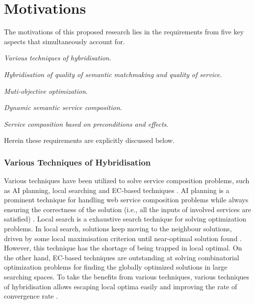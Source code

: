 \section{Motivations}\label{C:motivation}
The motivations of this proposed research lies in the requirements from five key aspects that simultaneously account for. 
\begin{enumerate*}
 \item \emph{Various techniques of hybridisation}.
 \item \emph{Hybridisation of quality of semantic matchmaking and quality of service}.
 \item \emph{Muti-objective optimization}.
 \item \emph{Dynamic semantic service composition}.
 \item \emph{Service composition based on preconditions and effects}.
\end{enumerate*}
Herein these requirements are explicitly discussed below. 
\subsubsection{Various Techniques of Hybridisation}

Various techniques have been utilized to solve service composition problems, such as AI planning, local searching and EC-based techniques \cite{feng2013dynamic,parejo2008qos,qi2010combining,wang2014automated}. AI planning is a prominent technique for handling web service composition problems while always ensuring the correctness of the solution (i.e., all the inputs of involved services are satisfied) \cite{wang2014automated}.  Local search is a exhaustive search technique for solving optimization problems. In local search, solutions keep moving to the neighbour solutions, driven by some local maximisation criterion until near-optimal solution found \cite{parejo2008qos}. However, this technique has the shortage of being trapped in local optimal. On the other hand, EC-based techniques are outstanding at solving combinatorial optimization problems for finding the globally optimized solutions in large searching spaces. To take the benefits from various techniques,  various techniques of hybridisation allows escaping local optima easily and improving the rate of convergence rate \cite{renders1996hybrid}.

